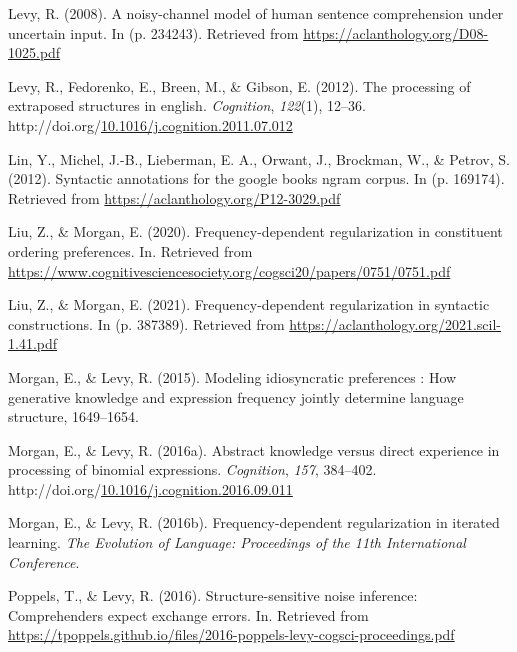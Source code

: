 \documentclass[10pt, letterpaper]{article}
\newenvironment{CSLReferences}%
  {}%
  {\par}
\begin{document}
\begin{CSLReferences}{1}{0}
\leavevmode{}%
Levy, R. (2008). A noisy-channel model of human sentence comprehension
under uncertain input. In (p. 234243). Retrieved from
\url{https://aclanthology.org/D08-1025.pdf}

\leavevmode{}%
Levy, R., Fedorenko, E., Breen, M., \& Gibson, E. (2012). The processing
of extraposed structures in english. \emph{Cognition}, \emph{122}(1),
12--36.
http://doi.org/\href{https://doi.org/10.1016/j.cognition.2011.07.012}{10.1016/j.cognition.2011.07.012}

\leavevmode{}%
Lin, Y., Michel, J.-B., Lieberman, E. A., Orwant, J., Brockman, W., \&
Petrov, S. (2012). Syntactic annotations for the google books ngram
corpus. In (p. 169174). Retrieved from
\url{https://aclanthology.org/P12-3029.pdf}

\leavevmode{}%
Liu, Z., \& Morgan, E. (2020). Frequency-dependent regularization in
constituent ordering preferences. In. Retrieved from
\url{https://www.cognitivesciencesociety.org/cogsci20/papers/0751/0751.pdf}

\leavevmode{}%
Liu, Z., \& Morgan, E. (2021). Frequency-dependent regularization in
syntactic constructions. In (p. 387389). Retrieved from
\url{https://aclanthology.org/2021.scil-1.41.pdf}

\leavevmode{}%
Morgan, E., \& Levy, R. (2015). Modeling idiosyncratic preferences : How
generative knowledge and expression frequency jointly determine language
structure, 1649--1654.

\leavevmode{}%
Morgan, E., \& Levy, R. (2016a). Abstract knowledge versus direct
experience in processing of binomial expressions. \emph{Cognition},
\emph{157}, 384--402.
http://doi.org/\href{https://doi.org/10.1016/j.cognition.2016.09.011}{10.1016/j.cognition.2016.09.011}

\leavevmode{}%
Morgan, E., \& Levy, R. (2016b). Frequency-dependent regularization in
iterated learning. \emph{The Evolution of Language: Proceedings of the
11th International Conference}.

\leavevmode{}%
Poppels, T., \& Levy, R. (2016). Structure-sensitive noise inference:
Comprehenders expect exchange errors. In. Retrieved from
\url{https://tpoppels.github.io/files/2016-poppels-levy-cogsci-proceedings.pdf}


\end{CSLReferences}
\end{document}

